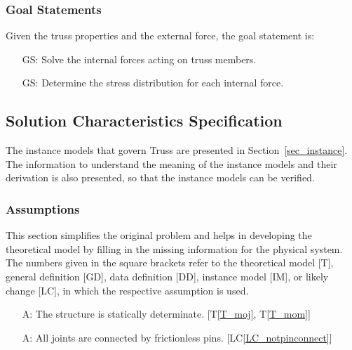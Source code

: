 \documentclass[12pt]{article}
\newcommand{\tref}[1]{T\ref{#1}}
\newcounter{assumpnum} %
\newcounter{goalnum} %
\newcommand{\lcref}[1]{LC\ref{#1}}
\begin{document}
\subsubsection{Goal Statements}\label{sec_goal}

\noindent 
Given the truss properties and the external force, the goal statement is:

\begin{itemize}

\item[GS\refstepcounter{goalnum}\thegoalnum \label{G_solforce}:] 
{Solve the internal forces acting on truss members.}
\item[GS\refstepcounter{goalnum}\thegoalnum \label{G_stressdist}:] 
{Determine the stress distribution for each internal force.}
\end{itemize}

\subsection{Solution Characteristics Specification} \label{Sec_solcharspec}

The instance models that govern Truss are presented in 
Section~\ref{sec_instance}.  The information to understand the meaning of the
instance models and their derivation is also presented, so that the instance
models can be verified.

\subsubsection{Assumptions} \label{sec_assumpt}

This section simplifies the original problem and helps in developing the
theoretical model by filling in the missing information for the physical
system. The numbers given in the square brackets refer to the theoretical model
[T], general definition [GD], data definition [DD], instance model [IM], or
likely change [LC], in which the respective assumption is used.

\begin{itemize}
	
\item[A\refstepcounter{assumpnum}\theassumpnum \label{A_static}:]
 The structure is statically determinate. [\tref{T_moj}, \tref{T_mom}]
 
\end{itemize}

\begin{itemize}
	
	\item[A\refstepcounter{assumpnum}\theassumpnum \label{A_frictionless}:]
	All joints are connected by frictionless pins. [\lcref{LC_notpinconnect}]
	
\end{itemize}
\end{document}
